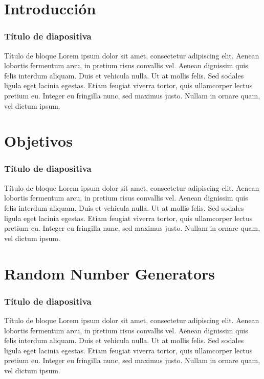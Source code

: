 \documentclass[10pt]{beamer}
\begin{document}
\section{Introducción}
\begin{frame}
    \frametitle{Título de diapositiva}
    \begin{block}{Título de bloque}
        \justifying
        Lorem ipsum dolor sit amet, consectetur adipiscing elit. Aenean lobortis fermentum arcu, in pretium risus convallis vel. Aenean dignissim quis felis interdum aliquam. Duis et vehicula nulla. Ut at mollis felis. Sed sodales ligula eget lacinia egestas. Etiam feugiat viverra tortor, quis ullamcorper lectus pretium eu. Integer eu fringilla nunc, sed maximus justo. Nullam in ornare quam, vel dictum ipsum.
	\end{block}
\end{frame}

\section{Objetivos}
\begin{frame}
    \frametitle{Título de diapositiva}
    \begin{block}{Título de bloque}
        \justifying
        Lorem ipsum dolor sit amet, consectetur adipiscing elit. Aenean lobortis fermentum arcu, in pretium risus convallis vel. Aenean dignissim quis felis interdum aliquam. Duis et vehicula nulla. Ut at mollis felis. Sed sodales ligula eget lacinia egestas. Etiam feugiat viverra tortor, quis ullamcorper lectus pretium eu. Integer eu fringilla nunc, sed maximus justo. Nullam in ornare quam, vel dictum ipsum.
	\end{block}
\end{frame}

\section{Random Number Generators}
\begin{frame}
    \frametitle{Título de diapositiva}
    \begin{block}{Título de bloque}
        \justifying
        Lorem ipsum dolor sit amet, consectetur adipiscing elit. Aenean lobortis fermentum arcu, in pretium risus convallis vel. Aenean dignissim quis felis interdum aliquam. Duis et vehicula nulla. Ut at mollis felis. Sed sodales ligula eget lacinia egestas. Etiam feugiat viverra tortor, quis ullamcorper lectus pretium eu. Integer eu fringilla nunc, sed maximus justo. Nullam in ornare quam, vel dictum ipsum.
	\end{block}
\end{frame}
\end{document}
